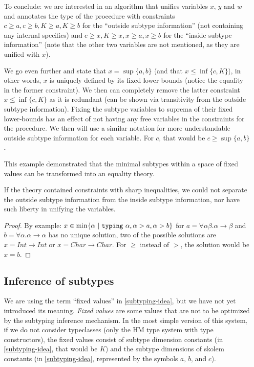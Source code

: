 To conclude: we are interested in an algorithm that unifies variables $x$, $y$ and $w$ and annotates the type of the procedure with constraints $c \geq a, c \geq b, K \geq a, K \geq b$ for the ``outside subtype information'' (not containing any internal specifics) and $c \geq x, K \geq x, x \geq a, x \geq b$ for the ``inside subtype information'' (note that the other two variables are not mentioned, as they are unified with $x$).

We go even further and state that $x = \sup \{a, b\}$ (and that $x \leq \inf \{c, K\}$), in other words, $x$ is uniquely defined by its fixed lower-bounds (notice the equality in the former constraint). We then can completely remove the latter constraint $x \leq \inf \{c, K\}$ as it is redundant (can be shown via transitivity from the outside subtype information). Fixing the subtype variables to suprema of their fixed lower-bounds has an effect of not having any free variables in the constraints for the procedure. We then will use a similar notation for more understandable outside subtype information for each variable. For $c$, that would be $c \geq \sup \{a, b\}$.

This example demonstrated that the minimal subtypes within a space of fixed values can be transformed into an equality theory.

\begin{observe}
    If the theory contained constraints with sharp inequalities, we could not separate the outside subtype information from the inside subtype information, nor have such liberty in unifying the variables.

    \begin{proof}
        By example: $x \in \min \{ \alpha \ |\  \mathtt{typing}\ \alpha, \alpha > a, \alpha > b \}$ for $a = \forall \alpha \beta . \alpha \to \beta$ and $b = \forall \alpha . \alpha \to \alpha$ has no unique solution, two of the possible solutions are $x = Int \to Int$ or $x = Char \to Char$. For $\geq$ instead of $>$, the solution would be $x = b$.
    \end{proof}
\end{observe}

\subsection{Inference of subtypes}
\label{sec:inferSub}

We are using the term ``fixed values'' in \cref{subtyping-idea}, but we have not yet introduced its meaning. \emph{Fixed values} are some values that are not to be optimized by the subtyping inference mechanism. In the most simple version of this system, if we do not consider typeclasses (only the HM type system with type constructors), the fixed values consist of subtype dimension constants (in \cref{subtyping-idea}, that would be $K$) and the subtype dimensions of skolem constants (in \cref{subtyping-idea}, represented by the symbols $a$, $b$, and $c$).

